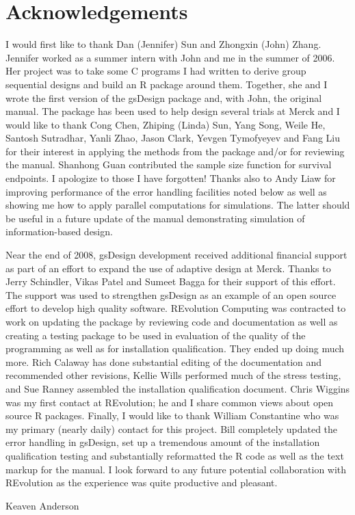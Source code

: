 \section{Acknowledgements}

I would first like to thank Dan (Jennifer) Sun and Zhongxin (John) Zhang. Jennifer worked as a summer intern with John and me in the summer of 2006. Her project was to take some C programs I had written to derive group sequential designs and build an R package around them. Together, she and I wrote the first version of the gsDesign package and, with John, the original manual. The package has been used to help design several trials at Merck and I would like to thank Cong Chen, Zhiping (Linda) Sun, Yang Song, Weile He, Santosh Sutradhar, Yanli Zhao, Jason Clark, Yevgen Tymofyeyev and Fang Liu for their interest in applying the methods from the package and/or for reviewing the manual. Shanhong Guan contributed the sample size function for survival endpoints. I apologize to those I have forgotten! Thanks also to Andy Liaw for improving performance of the error handling facilities noted below as well as showing me how to apply parallel computations for simulations. The latter should be useful in a future update of the manual demonstrating simulation of information-based design.

Near the end of 2008, gsDesign development received additional financial support as part of an effort to expand the use of adaptive design at Merck. Thanks to Jerry Schindler, Vikas Patel and Sumeet Bagga for their support of this effort. The support was used to strengthen gsDesign as an example of an open source effort to develop high quality software. REvolution Computing was contracted to work on updating the package by reviewing code and documentation as well as creating a testing package to be used in evaluation of the quality of the programming as well as for installation qualification. They ended up doing much more. Rich Calaway has done substantial editing of the documentation and recommended other revisions, Kellie Wills performed much of the stress testing, and Sue Ranney assembled the installation qualification document. Chris Wiggins was my first contact at REvolution; he and I share common views about open source R packages. Finally, I would like to thank William Constantine who was my primary (nearly daily) contact for this project. Bill completely updated the error handling in gsDesign, set up a tremendous amount of the installation qualification testing and substantially reformatted the R code as well as the text markup for the manual. I look forward to any future potential collaboration with REvolution as the experience was quite productive and pleasant.

Keaven Anderson

